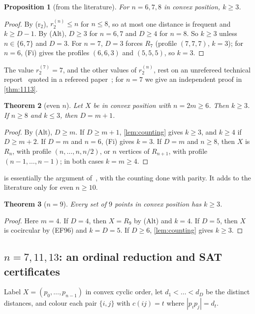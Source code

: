 \documentclass[11pt]{amsart}
\newtheorem{theorem}{Theorem}[section]
\newtheorem{proposition}[theorem]{Proposition}
\theoremstyle{definition}
\theoremstyle{remark}
\begin{document}
\begin{proposition}[from the literature]\label{prop:lit678}
For $n=6,7,8$ in convex position, $k\ge3$.
\end{proposition}
\begin{proof}
By (r$_2$), $r_2^{(n)}\le n$ for $n\le8$, so at most one distance is frequent and $k\ge D-1$. By (Alt), $D\ge3$ for $n=6,7$ and $D\ge4$ for $n=8$. So $k\ge3$ unless $n\in\{6,7\}$ and $D=3$. For $n=7$, $D=3$ forces $R_7$ (profile $(7,7,7)$, $k=3$); for $n=6$, (Fi) gives the profiles $(6,6,3)$ and $(5,5,5)$, so $k=3$.
\end{proof}
The value $r_2^{(7)}=7$, and the other values of $r_2^{(n)}$, rest on an unrefereed technical report~\cite{Fi92} quoted in a refereed paper~\cite{EF95b}; for $n=7$ we give an independent proof in \cref{thm:1113}.

\begin{theorem}[even $n$]\label{thm:even}
Let $X$ be in convex position with $n=2m\ge6$. Then $k\ge3$. If $n\ge8$ and $k\le3$, then $D=m+1$.
\end{theorem}
\begin{proof}
By (Alt), $D\ge m$. If $D\ge m+1$, \cref{lem:counting} gives $k\ge3$, and $k\ge4$ if $D\ge m+2$. If $D=m$ and $n=6$, (Fi) gives $k=3$. If $D=m$ and $n\ge8$, then $X$ is $R_n$, with profile $(n,\dots,n,n/2)$, or $n$ vertices of $R_{n+1}$, with profile $(n-1,\dots,n-1)$; in both cases $k=m\ge4$.
\end{proof}
 is essentially the argument of~\cite[Theorem~1.2]{CDL25}, with the counting done with parity. It adds to the literature only for even $n\ge10$.

\begin{theorem}[$n=9$]\label{thm:nine}
Every set of $9$ points in convex position has $k\ge3$.
\end{theorem}
\begin{proof}
Here $m=4$. If $D=4$, then $X=R_9$ by (Alt) and $k=4$. If $D=5$, then $X$ is cocircular by (EF96) and $k=D=5$. If $D\ge6$, \cref{lem:counting} gives $k\ge3$.
\end{proof}

\subsection{\texorpdfstring{$n=7,11,13$}{n = 7, 11, 13}: an ordinal reduction and SAT certificates}\label{sec:sat}

Label $X=(p_0,\dots,p_{n-1})$ in convex cyclic order, let $d_1<\dots<d_D$ be the distinct distances, and colour each pair $\{i,j\}$ with $c(ij)=t$ where $|p_ip_j|=d_t$.
\end{document}
